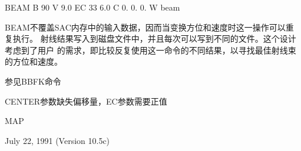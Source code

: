 BEAM  B 90  V 9.0 EC 33  6.0 C  0. 0. 0. W beam

BEAM不覆盖SAC内存中的输入数据，因而当变换方位和速度时这一操作可以重复执行。
射线结果写入到磁盘文件中，并且每次可以写到不同的文件。这个设计考虑到了用户
的需求，即比较反复使用这一命令的不同结果，以寻找最佳射线束的方位和速度。

参见BBFK命令

CENTER参数缺失偏移量，EC参数需要正值

MAP

July 22, 1991 (Version 10.5c)
